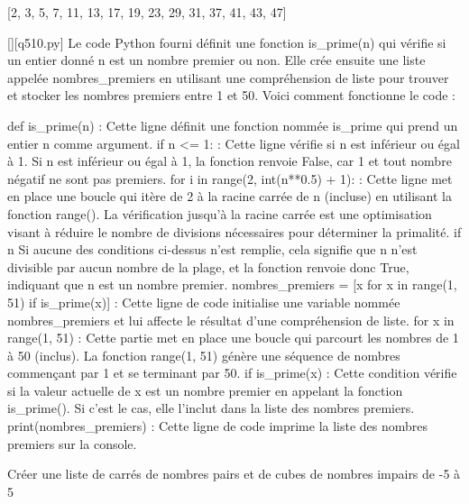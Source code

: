 [2, 3, 5, 7, 11, 13, 17, 19, 23, 29, 31, 37, 41, 43, 47]
        \par
        \begin{solution}
            \renewcommand{\nomfichier}{q510.py}
            \pythonfile{\chemincode \nomfichier}[][\nomfichier]
            Le code Python fourni définit une fonction is_prime(n) qui vérifie si un entier donné n est un nombre premier ou non. Elle crée ensuite une liste appelée nombres_premiers en utilisant une compréhension de liste pour trouver et stocker les nombres premiers entre 1 et 50. Voici comment fonctionne le code :

    def is_prime(n) : Cette ligne définit une fonction nommée is_prime qui prend un entier n comme argument.
        if n <= 1: : Cette ligne vérifie si n est inférieur ou égal à 1. Si n est inférieur ou égal à 1, la fonction renvoie False, car 1 et tout nombre négatif ne sont pas premiers.
        for i in range(2, int(n**0.5) + 1): : Cette ligne met en place une boucle qui itère de 2 à la racine carrée de n (incluse) en utilisant la fonction range(). La vérification jusqu'à la racine carrée est une optimisation visant à réduire le nombre de divisions nécessaires pour déterminer la primalité.
        if n %
        Si aucune des conditions ci-dessus n'est remplie, cela signifie que n n'est divisible par aucun nombre de la plage, et la fonction renvoie donc True, indiquant que n est un nombre premier.
    nombres_premiers = [x for x in range(1, 51) if is_prime(x)] : Cette ligne de code initialise une variable nommée nombres_premiers et lui affecte le résultat d'une compréhension de liste.
        for x in range(1, 51) : Cette partie met en place une boucle qui parcourt les nombres de 1 à 50 (inclus). La fonction range(1, 51) génère une séquence de nombres commençant par 1 et se terminant par 50.
        if is_prime(x) : Cette condition vérifie si la valeur actuelle de x est un nombre premier en appelant la fonction is_prime(). Si c'est le cas, elle l'inclut dans la liste des nombres premiers.
    print(nombres_premiers) : Cette ligne de code imprime la liste des nombres premiers sur la console.
        \end{solution}
        

        \question
        Créer une liste de carrés de nombres pairs et de cubes de nombres impairs de -5 à 5


